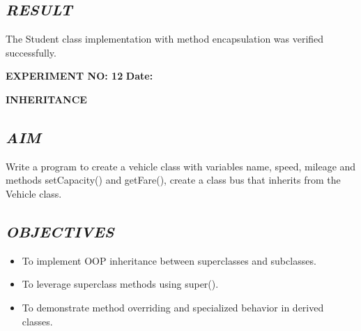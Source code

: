 \documentclass[11pt,a4paper]{article}
\begin{document}
\subsection*{\textit{RESULT}}
The Student class implementation with method encapsulation was verified successfully.

\newpage

\noindent
\textbf{\large EXPERIMENT NO: 12} \hfill \textbf{\large Date: \underline{\hspace{3cm}}}

\vspace{0.2cm}
\begin{center}
{\Huge \textbf{\textcolor{navyblue}{INHERITANCE}}}
\end{center}
\vspace{0.3cm}

\subsection*{\textit{AIM}}
Write a program to create a vehicle class with variables name, speed, mileage and methods setCapacity() and getFare(), create a class bus that inherits from the Vehicle class.

\subsection*{\textit{OBJECTIVES}}
\begin{itemize}
  \item To implement OOP inheritance between superclasses and subclasses.
  \item To leverage superclass methods using super().
  \item To demonstrate method overriding and specialized behavior in derived classes.
\end{itemize}
\end{document}
